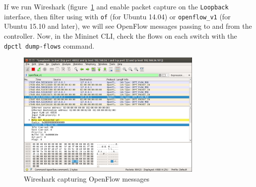 If we run Wireshark (figure~\ref{fig:wireshark} and enable packet capture on the \texttt{Loopback} interface, then filter using with \texttt{of} (for Ubuntu 14.04) or \texttt{openflow\_v1} (for Ubuntu 15.10 and later), we will see OpenFlow messages passing to and from the controller. Now, in the Mininet CLI, check the flows on each switch with the \texttt{dpctl dump-flows} command.

\begin{figure}
    \centering
    \includegraphics[width=0.8\textwidth]{Pictures/mn-wifi-121.png}
    \caption{Wireshark capturing OpenFlow messages}
    \label{fig:wireshark}
\end{figure}

